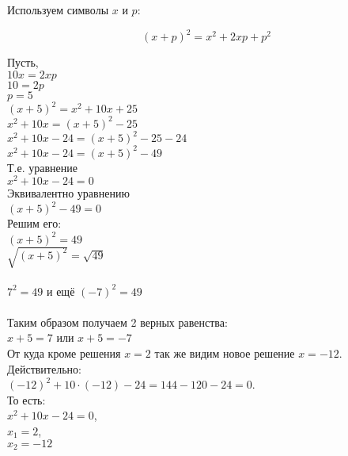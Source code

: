 Используем символы $x$ и $p$:

\begin{equation*}
  \left( x + p \right)^2 = x^2 + 2xp + p^2
\end{equation*}

Пусть,\\
$ 10x = 2xp $ \\
$ 10 = 2p   $ \\
$ p = 5     $ \\
$ \left( x + 5 \right)^2 = x^2 + 10x + 25 $ \\
$ x^2 + 10x = \left( x + 5 \right)^2 - 25 $ \\
$ x^2 + 10x - 24 = \left( x + 5 \right)^2 - 25 - 24$ \\
$ x^2 + 10x - 24 = \left( x + 5 \right)^2 - 49$ \\
Т.е. уравнение \\
$ x^2 + 10x - 24 = 0 $ \\
Эквивалентно уравнению \\
$ \left( x + 5 \right)^2 - 49 = 0 $ \\
Решим его: \\
$ \left( x + 5 \right)^2 = 49 $ \\
$ \sqrt{\left( x + 5 \right)^2} = \sqrt{49} $ \\
\\
$ 7^2 = 49$ и ещё $ (-7)^2 = 49 $ \\
\\
Таким образом получаем 2 верных равенства: \\
$x + 5 = 7$ \qquad или \qquad $x + 5 = -7$ \\
От куда кроме решения $x=2$ так же видим новое решение $x=-12$. Действительно:\\
$(-12)^2 + 10 \cdot (-12) - 24 = 144 - 120 -24 = 0$.\\
То есть: \\
$ x^2 + 10x - 24 = 0 $, \\
$ x_1 = 2 $, \\
$ x_2 = -12 $


